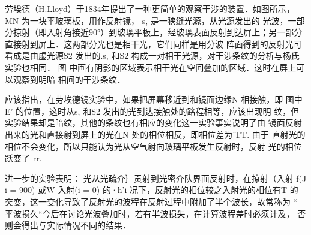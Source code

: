 
劳埃德（H.Lloyd）于1834年提出了一种更简单的观察干涉的装置．如图所示，MN 为一块平玻璃板，用作反射镜， s, 是一狭缝光源，从光源发出的
光波，一部分掠射（即入射角接近$90°$）到玻璃平板上，经玻璃表面反射到达屏上；另一部分直接射到屏上．这两部分光也是相干光，它们同样是用分波
阵面得到的反射光可看成是由虚光源S2 发出的.s, 和S2 构成一对相干光源，对干涉条纹的分析与杨氏实验也相同． 图
中画有阴影的区域表示相干光在空间叠加的区域．这时在屏上可以观察到明暗
相间的干涉条纹．

应该指出，在劳埃德镜实验中，如果把屏幕移近到和镜面边缘N 相接触，即
图中E' 的位置，这时从s, 和S2 发出的光到达接触处的路程相等，应该出现明
纹，但实验结果却是暗纹，其他的条纹也有相应的变化这一实验事实说明了由
镜面反射出来的光和直接射到屏上的光在N 处的相位相反，即相位差为'TT. 由于
直射光的相位不会变化，所以只能认为光从空气射向玻璃平板发生反射时，反射
光的相位跃变了-rr.

进一步的实验表明： 光从光疏介｝贡射到光密介队界面反射时，在掠射（入射
f(J i = 900) 或W 入射(i = 0) 的·h'i 况下，反射光的相位较之入射光的相位有T 的
突变，这一变化导致了反射光的波程在反射过程中附加了半个波长，故常称为
“ 平波损久“今后在讨论光波叠加时，若有半波损失，在计算波程差时必须计及，
否则会得出与实际情况不同的结果．